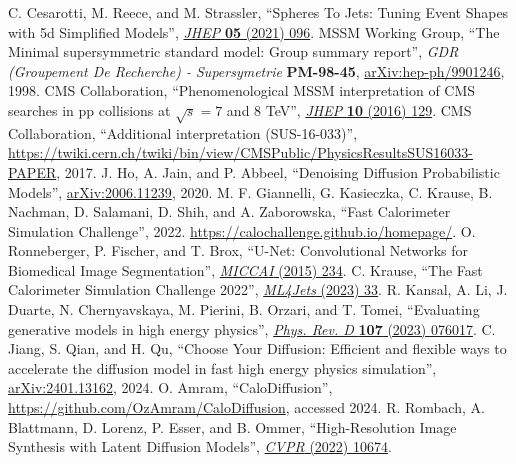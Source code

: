 \begin{thebibliography}{99}
 C. Cesarotti, M. Reece, and M. Strassler, ``Spheres To Jets: Tuning Event Shapes with 5d Simplified Models'', \href{https://doi.org/10.1007/JHEP05(2021)096}{\textit{JHEP} \textbf{05} (2021) 096}.
 MSSM Working Group, ``The Minimal supersymmetric standard model: Group summary report'', \textit{GDR (Groupement De Recherche) - Supersymetrie} \textbf{PM-98-45}, \href{https://arxiv.org/abs/hep-ph/9901246}{arXiv:hep-ph/9901246}, 1998.
 CMS Collaboration, ``Phenomenological MSSM interpretation of CMS searches in pp collisions at $\sqrt{s} = 7$ and 8 TeV'', \href{https://doi.org/10.1007/JHEP10(2016)129}{\textit{JHEP} \textbf{10} (2016) 129}.
 CMS Collaboration, ``Additional interpretation (SUS-16-033)'', \href{https://twiki.cern.ch/twiki/bin/view/CMSPublic/PhysicsResultsSUS16033-PAPER}{https://twiki.cern.ch/twiki/bin/view/CMSPublic/PhysicsResultsSUS16033-PAPER}, 2017.
 J. Ho, A. Jain, and P. Abbeel, ``Denoising Diffusion Probabilistic Models'', \href{https://arxiv.org/abs/2006.11239}{arXiv:2006.11239}, 2020.
 M. F. Giannelli, G. Kasieczka, C. Krause, B. Nachman, D. Salamani, D. Shih, and A. Zaborowska, ``Fast Calorimeter Simulation Challenge'', 2022. \url{https://calochallenge.github.io/homepage/}.
 O. Ronneberger, P. Fischer, and T. Brox, ``U-Net: Convolutional Networks for Biomedical Image Segmentation'', \href{https://doi.org/10.1007/978-3-319-24574-4_28}{\textit{MICCAI} (2015) 234}.
 C. Krause, ``The Fast Calorimeter Simulation Challenge 2022'', \href{https://indico.cern.ch/event/1253794/contributions/5588599/}{\textit{ML4Jets} (2023) 33}.
 R. Kansal, A. Li, J. Duarte, N. Chernyavskaya, M. Pierini, B. Orzari, and T. Tomei, ``Evaluating generative models in high energy physics'', \href{https://doi.org/10.1103/PhysRevD.107.076017}{\textit{Phys. Rev. D} \textbf{107} (2023) 076017}.
 C. Jiang, S. Qian, and H. Qu, ``Choose Your Diffusion: Efficient and flexible ways to accelerate the diffusion model in fast high energy physics simulation'', \href{https://arxiv.org/abs/2401.13162}{arXiv:2401.13162}, 2024.
 O. Amram, ``CaloDiffusion'', \href{https://github.com/OzAmram/CaloDiffusion}{https://github.com/OzAmram/CaloDiffusion}, accessed 2024.
 R. Rombach, A. Blattmann, D. Lorenz, P. Esser, and B. Ommer, ``High-Resolution Image Synthesis with Latent Diffusion Models'', \href{https://doi.ieeecomputersociety.org/10.1109/CVPR52688.2022.01042}{\textit{CVPR} (2022) 10674}.

\end{thebibliography}
